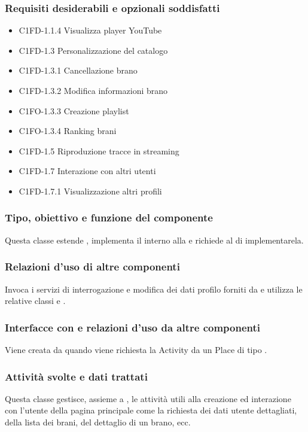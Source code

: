 \subsubsection*{Requisiti desiderabili e opzionali soddisfatti}
\begin{itemize}
    \item C1FD-1.1.4 Visualizza player YouTube
    \item C1FD-1.3 Personalizzazione del catalogo 
    \item C1FD-1.3.1 Cancellazione brano
    \item C1FD-1.3.2 Modifica informazioni brano
    \item C1FO-1.3.3 Creazione playlist
    \item C1FO-1.3.4 Ranking brani
    \item C1FD-1.5 Riproduzione tracce in streaming
    \item C1FD-1.7 Interazione con altri utenti
    \item C1FD-1.7.1 Visualizzazione altri profili
\end{itemize}
\subsubsection*{Tipo, obiettivo e funzione del componente}
Questa classe estende , implementa il 
interno alla  e richiede al  di
implementarela.
\subsubsection*{Relazioni d'uso di altre componenti}
Invoca i servizi di interrogazione e modifica dei dati profilo forniti da
 e utilizza le relative classi  e
.
\subsubsection*{Interfacce con e relazioni d'uso da altre componenti}
Viene creata da  quando viene richiesta la Activity da
un Place di tipo .
\subsubsection*{Attivit\`a svolte e dati trattati}
Questa classe gestisce, assieme a , le attivit\`a utili alla
creazione ed interazione con l'utente della pagina principale come la
richiesta dei dati utente dettagliati, della lista dei brani, del dettaglio di
un brano, ecc.

